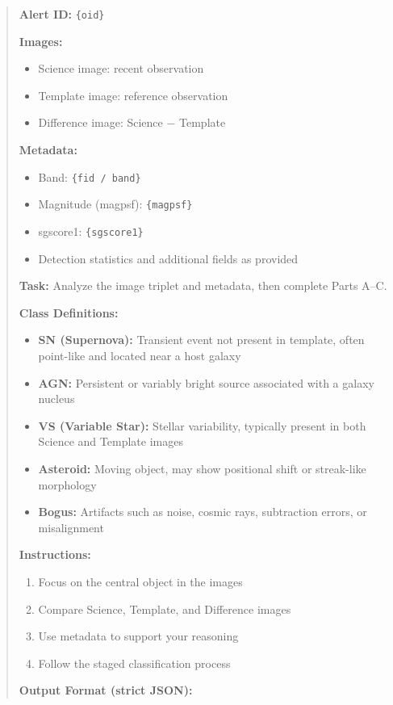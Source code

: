 \documentclass[11pt,a4paper]{article}
\begin{document}
\begin{quote}\small
\textbf{Alert ID:} \texttt{\{oid\}}

\textbf{Images:}
\begin{itemize}[leftmargin=*]
  \item Science image: recent observation
  \item Template image: reference observation
  \item Difference image: Science $-$ Template
\end{itemize}

\textbf{Metadata:}
\begin{itemize}[leftmargin=*]
  \item Band: \texttt{\{fid / band\}}
  \item Magnitude (magpsf): \texttt{\{magpsf\}}
  \item sgscore1: \texttt{\{sgscore1\}}
  \item Detection statistics and additional fields as provided
\end{itemize}

\textbf{Task:} Analyze the image triplet and metadata, then complete Parts A--C.

\textbf{Class Definitions:}
\begin{itemize}[leftmargin=*]
  \item \textbf{SN (Supernova):} Transient event not present in template, often point-like and located near a host galaxy
  \item \textbf{AGN:} Persistent or variably bright source associated with a galaxy nucleus
  \item \textbf{VS (Variable Star):} Stellar variability, typically present in both Science and Template images
  \item \textbf{Asteroid:} Moving object, may show positional shift or streak-like morphology
  \item \textbf{Bogus:} Artifacts such as noise, cosmic rays, subtraction errors, or misalignment
\end{itemize}

\textbf{Instructions:}
\begin{enumerate}[leftmargin=*]
  \item Focus on the central object in the images
  \item Compare Science, Template, and Difference images
  \item Use metadata to support your reasoning
  \item Follow the staged classification process
\end{enumerate}

\textbf{Output Format (strict JSON):}
\end{quote}
\end{document}
